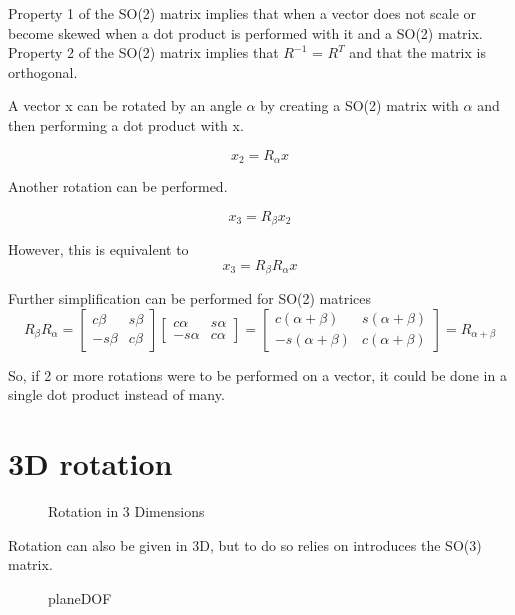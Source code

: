 Property 1 of the SO(2) matrix implies that when a vector does not scale or become skewed when a dot product is performed with it and a SO(2) matrix. Property 2 of the SO(2) matrix implies that $R^{-1}$ = $R^T$ and that the matrix is orthogonal. 

A vector x can be rotated by an angle $\alpha$ by creating a SO(2) matrix with $\alpha$ and then performing a dot product with x. 

\begin{equation}
    x_2 = R_\alpha x
    \label{eqn:xRotation}
\end{equation}

Another rotation can be performed.

\begin{equation}
    x_3 = R_\beta x_2
    \label{eqn:xRotation_2}
\end{equation}

However, this is equivalent to
\begin{equation}
    x_3 = R_\beta R_\alpha x
    \label{eqn:xRotation_3}
\end{equation}

Further simplification can be performed for SO(2) matrices
\begin{equation}
    R_\beta R_\alpha = \begin{bmatrix} c\beta & s\beta \\ -s\beta & c\beta \end{bmatrix} \begin{bmatrix} c\alpha & s\alpha \\ -s\alpha & c\alpha \end{bmatrix} = \begin{bmatrix} c(\alpha + \beta) & s(\alpha + \beta) \\ -s(\alpha + \beta) & c(\alpha + \beta) \end{bmatrix} = R_{\alpha + \beta}
\end{equation}

So, if 2 or more rotations were to be performed on a vector, it could be done in a single dot product instead of many.

\section{3D rotation}
\begin{figure}[ht]
    \centering
    \caption{Rotation in 3 Dimensions}
    \label{fig:rot3d}
\end{figure}

Rotation can also be given in 3D, but to do so relies on introduces the SO(3) matrix. 
\begin{figure}[ht]
    \centering
    \caption{planeDOF}
    \label{fig:planedof}
\end{figure}
